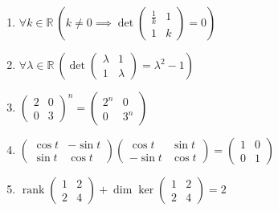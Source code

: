 \documentclass[11pt,a4paper]{article}
\begin{document}
\begin{enumerate}
\item $\displaystyle \forall k \in \mathbb{R}\ \left( k \neq 0 \implies \det \begin{pmatrix} \frac{1}{k} & 1 \\ 1 & k \end{pmatrix} = 0 \right)$
\item $\displaystyle \forall \lambda \in \mathbb{R}\ \left( \det \begin{pmatrix} \lambda & 1 \\ 1 & \lambda \end{pmatrix} = \lambda^{2} - 1 \right)$
\item $\displaystyle \begin{pmatrix} 2 & 0 \\ 0 & 3 \end{pmatrix}^{n} = \begin{pmatrix} 2^{n} & 0 \\ 0 & 3^{n} \end{pmatrix}$
\item $\displaystyle \begin{pmatrix} \cos t & -\sin t \\ \sin t & \cos t \end{pmatrix} \begin{pmatrix} \cos t & \sin t \\ -\sin t & \cos t \end{pmatrix} = \begin{pmatrix} 1 & 0 \\ 0 & 1 \end{pmatrix}$
\item $\displaystyle \operatorname{rank} \begin{pmatrix} 1 & 2 \\ 2 & 4 \end{pmatrix} + \dim \ker \begin{pmatrix} 1 & 2 \\ 2 & 4 \end{pmatrix} = 2$
\end{enumerate}
\end{document}
